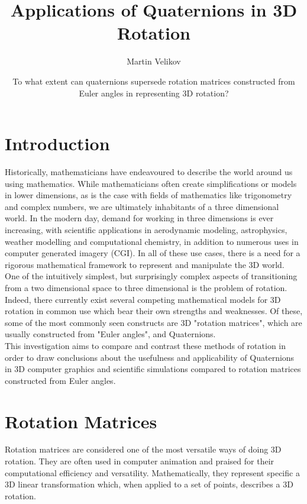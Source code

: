 \documentclass[12pt, a4paper]{article}
\title{\vspace{-3cm}Applications of Quaternions in 3D Rotation}
\author{Martin Velikov}
\date{To what extent can quaternions supersede rotation matrices constructed from Euler
    angles in representing 3D rotation?}
\begin{document}
\maketitle
\tableofcontents

\pagebreak

\section{Introduction}
Historically, mathematicians have endeavoured to describe the world around us
using mathematics. While mathematicians often create simplifications or models
in lower dimensions, as is the case with fields of mathematics like trigonometry
and complex numbers, we are ultimately inhabitants of a three dimensional world.
In the modern day, demand for working in three dimensions is ever increasing,
with scientific applications in aerodynamic modeling, astrophysics, weather
modelling and computational chemistry, in addition to numerous uses in computer
generated imagery (CGI). In all of these use cases, there is a need for a
rigorous mathematical framework to represent and manipulate the 3D world. \\

One of the intuitively simplest, but surprisingly complex aspects of
transitioning from a two dimensional space to three dimensional is the problem
of rotation. Indeed, there currently exist several competing mathematical models
for 3D rotation in common use which bear their own strengths and weaknesses. Of
these, some of the most commonly seen constructs are 3D "rotation matrices",
which are usually constructed from "Euler angles", and Quaternions.\\

This investigation aims to compare and contrast these methods of rotation in
order to draw conclusions about the usefulness and applicability of Quaternions
in 3D computer graphics and scientific simulations compared to rotation matrices
constructed from Euler angles.

\section{Rotation Matrices}
Rotation matrices are considered one of the most versatile ways of doing 3D
rotation. They are often used in computer animation and praised for their
computational efficiency and versatility. Mathematically, they represent
specific a 3D linear transformation which, when applied to a set of points,
describes a 3D rotation.
\end{document}
